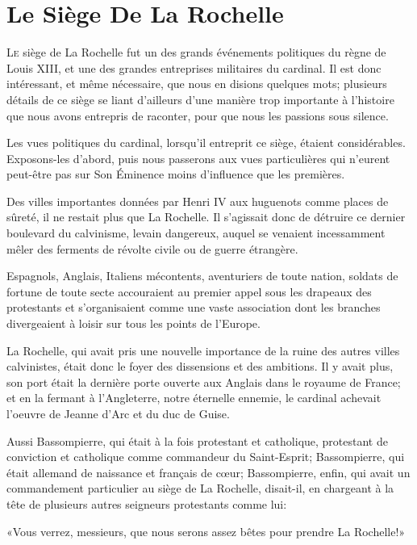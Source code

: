 
\chapter{Le Siège De La Rochelle}

\lettrine{L}{e} siège de La Rochelle fut un des grands événements politiques du règne de Louis XIII, et une des grandes entreprises militaires du cardinal. Il est donc intéressant, et même nécessaire, que nous en disions quelques mots; plusieurs détails de ce siège se liant d'ailleurs d'une manière trop importante à l'histoire que nous avons entrepris de raconter, pour que nous les passions sous silence. 

Les vues politiques du cardinal, lorsqu'il entreprit ce siège, étaient considérables. Exposons-les d'abord, puis nous passerons aux vues particulières qui n'eurent peut-être pas sur Son Éminence moins d'influence que les premières. 

Des villes importantes données par Henri IV aux huguenots comme places de sûreté, il ne restait plus que La Rochelle. Il s'agissait donc de détruire ce dernier boulevard du calvinisme, levain dangereux, auquel se venaient incessamment mêler des ferments de révolte civile ou de guerre étrangère. 

Espagnols, Anglais, Italiens mécontents, aventuriers de toute nation, soldats de fortune de toute secte accouraient au premier appel sous les drapeaux des protestants et s'organisaient comme une vaste association dont les branches divergeaient à loisir sur tous les points de l'Europe. 

La Rochelle, qui avait pris une nouvelle importance de la ruine des autres villes calvinistes, était donc le foyer des dissensions et des ambitions. Il y avait plus, son port était la dernière porte ouverte aux Anglais dans le royaume de France; et en la fermant à l'Angleterre, notre éternelle ennemie, le cardinal achevait l'oeuvre de Jeanne d'Arc et du duc de Guise. 

Aussi Bassompierre, qui était à la fois protestant et catholique, protestant de conviction et catholique comme commandeur du Saint-Esprit; Bassompierre, qui était allemand de naissance et français de cœur; Bassompierre, enfin, qui avait un commandement particulier au siège de La Rochelle, disait-il, en chargeant à la tête de plusieurs autres seigneurs protestants comme lui: 

«Vous verrez, messieurs, que nous serons assez bêtes pour prendre La Rochelle!» 

